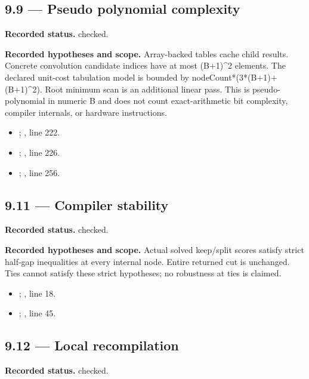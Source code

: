 \subsection{9.9 — Pseudo polynomial complexity}
\label{result:9.9}
\textbf{Recorded status.} checked.

\textbf{Recorded hypotheses and scope.} Array-backed tables cache child results. Concrete convolution candidate indices have at most (B+1)\textasciicircum{}2 elements. The declared unit-cost tabulation model is bounded by nodeCount*(3*(B+1)+(B+1)\textasciicircum{}2). Root minimum scan is an additional linear pass. This is pseudo-polynomial in numeric B and does not count exact-arithmetic bit complexity, compiler internals, or hardware instructions.

\begin{itemize}
\item {}; , line 222.
\item {}; , line 226.
\item {}; , line 256.
\end{itemize}
\subsection{9.11 — Compiler stability}
\label{result:9.11}
\textbf{Recorded status.} checked.

\textbf{Recorded hypotheses and scope.} Actual solved keep/split scores satisfy strict half-gap inequalities at every internal node. Entire returned cut is unchanged. Ties cannot satisfy these strict hypotheses; no robustness at ties is claimed.

\begin{itemize}
\item {}; , line 18.
\item {}; , line 45.
\end{itemize}
\subsection{9.12 — Local recompilation}
\label{result:9.12}
\textbf{Recorded status.} checked.

